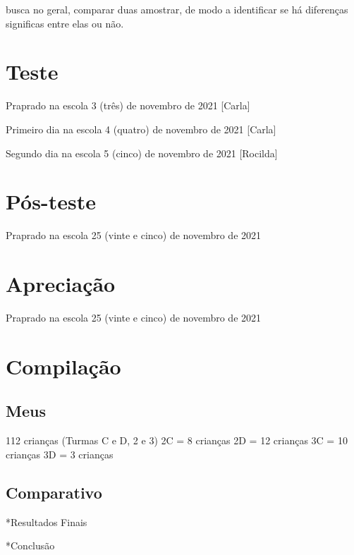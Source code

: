busca no geral, comparar duas amostrar, de modo a identificar se há diferenças significas entre elas ou não. 




\section{Teste}\label{sec:tes}

Praprado na escola 3 (três) de novembro de 2021 [Carla]

Primeiro dia na escola 4 (quatro) de novembro de 2021 [Carla]
 
Segundo dia na escola 5 (cinco) de novembro de 2021 [Rocilda]

\section{Pós-teste}\label{sec:postes}


Praprado na escola 25 (vinte e cinco) de novembro de 2021

\section{Apreciação}\label{sec:apreciar}

Praprado na escola 25 (vinte e cinco) de novembro de 2021

\section{Compilação}\label{sec:compilar}

\subsection{Meus}\label{subsec:meus}


112 crianças (Turmas C e D, 2 e 3)
2C = 8 crianças
2D = 12 crianças
3C = 10 crianças
3D = 3 crianças


\subsection{Comparativo}\label{subsec:outros}



*Resultados Finais

*Conclusão







